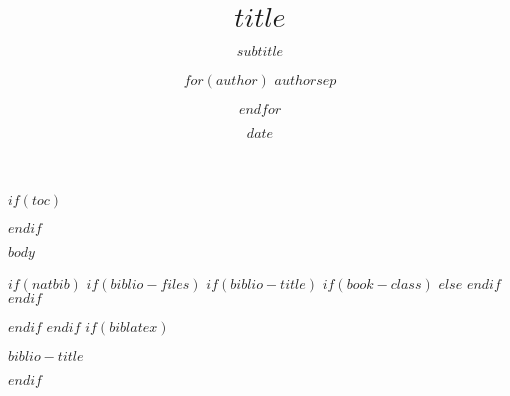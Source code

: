 \documentclass[
  fleqn,compress,utf8,aspectratio=169,t,
]{beamer}
\title{$title$}
\subtitle{$subtitle$}
\author{%
  $for(author)$
  $author$$sep$ \and
  $endfor$}
\date{$date$}
\institute{$institute$}
\newif\ifbibliography
\begin{document}
\begin{frame}
  \titlepage
\end{frame}
$if(toc)$
\begin{frame}
  \tableofcontents[hideallsubsections]
\end{frame}
$endif$

$body$

$if(natbib)$
$if(biblio-files)$
$if(biblio-title)$
$if(book-class)$
\renewcommand\bibname{$biblio-title$}
$else$
\renewcommand\refname{$biblio-title$}
$endif$
$endif$


$endif$
$endif$
$if(biblatex)$
\begin{frame}[allowframebreaks]{$biblio-title$}
  \bibliographytrue
  \nocite{*}
  \printbibliography[heading=none]
\end{frame}

$endif$
\end{document}
